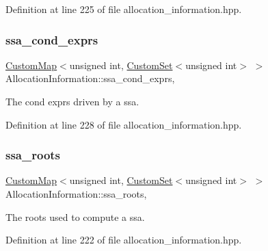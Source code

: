 Definition at line 225 of file allocation\+\_\+information.\+hpp.

\mbox{\label{classAllocationInformation_a712d53b3d241f270b98d8b0b96cb6122}} 
\subsubsection{\texorpdfstring{ssa\+\_\+cond\+\_\+exprs}{ssa\_cond\_exprs}}
{\footnotesize\ttfamily \hyperlink{custom__map_8hpp_a18ca01763abbe3e5623223bfe5aaac6b}{Custom\+Map}$<$unsigned int, \hyperlink{custom__set_8hpp_a615bc2f42fc38a4bb1790d12c759e86f}{Custom\+Set}$<$unsigned int$>$ $>$ Allocation\+Information\+::ssa\+\_\+cond\+\_\+exprs\hspace{0.3cm}{\ttfamily [mutable]}, {\ttfamily [private]}}



The cond exprs driven by a ssa. 



Definition at line 228 of file allocation\+\_\+information.\+hpp.

\mbox{\label{classAllocationInformation_a0dd5083f4469a235b905714b082d1d75}} 
\subsubsection{\texorpdfstring{ssa\+\_\+roots}{ssa\_roots}}
{\footnotesize\ttfamily \hyperlink{custom__map_8hpp_a18ca01763abbe3e5623223bfe5aaac6b}{Custom\+Map}$<$unsigned int, \hyperlink{custom__set_8hpp_a615bc2f42fc38a4bb1790d12c759e86f}{Custom\+Set}$<$unsigned int$>$ $>$ Allocation\+Information\+::ssa\+\_\+roots\hspace{0.3cm}{\ttfamily [mutable]}, {\ttfamily [private]}}



The roots used to compute a ssa. 



Definition at line 222 of file allocation\+\_\+information.\+hpp.

\mbox{\label{classAllocationInformation_a64173249b54a813f36ed1f15b5eabfba}} 
